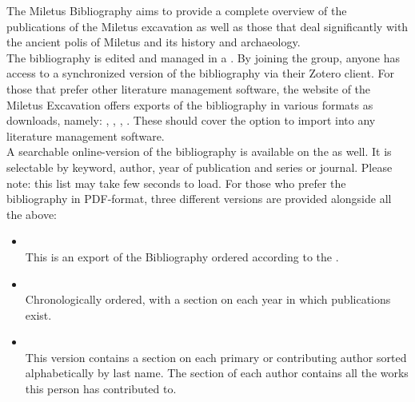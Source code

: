 \documentclass[a4paper]{scrartcl}
\newcommand{\redhref}[2]{\href{#1}{\color{uhhred}{#2}}}
\begin{document}


The Miletus Bibliography aims to provide a complete overview of the publications of the Miletus excavation as well as those that deal significantly with the ancient polis of Miletus and its history and archaeology.\\

The bibliography is edited and managed in a \redhref{https://www.zotero.org/groups/4475959/milet_bibliography}{publicly accessible Zotero group library}. By joining the group, anyone has access to a synchronized version of the bibliography via their Zotero client. For those that prefer other literature management software, the website of the Miletus Excavation offers exports of the bibliography in various formats as downloads, namely: \redhref{https://github.com/Miletus-Excavation/Miletus_Bibliography/releases/latest/download/Milet_Bibliography_BibLaTeX.bib}{BibLaTeX}, \redhref{https://github.com/Miletus-Excavation/Miletus_Bibliography/releases/latest/download/Milet_Bibliography_BibTeX.bib}{BibTeX}, \redhref{https://github.com/Miletus-Excavation/Miletus_Bibliography/releases/latest/download/Milet_Bibliography_CSV.csv}{CSV}, \redhref{https://github.com/Miletus-Excavation/Miletus_Bibliography/releases/latest/download/Milet_Bibliography_RIS.ris}{RIS}. These should cover the option to import into any literature management software.\\

A searchable online-version of the bibliography is available on the \redhref{https://www.miletgrabung.uni-hamburg.de/material/bibliographie.html}{homepage of the Miletus Excavation} as well. It is selectable by keyword, author, year of publication and series or journal. Please note: this list may take few seconds to load. For those who prefer the bibliography in PDF-format, three different versions are provided alongside all the above: 

\begin{itemize}
    \item \redhref{https://github.com/Miletus-Excavation/Miletus_Bibliography/releases/latest/download/milet-bibliographie-by-tag-pdf.pdf}{Milet-Bibliographie, by keyword (PDF)}\\
    This is an export of the Bibliography ordered according to the \redhref{https://www.miletgrabung.uni-hamburg.de/en/material/bibliographie/bib-tags.html}{System of Keywords}.
    \item \redhref{https://github.com/Miletus-Excavation/Miletus_Bibliography/releases/latest/download/milet-bibliographie-by-year-pdf.pdf}{Milet-Bibliographie, chronological (PDF)}\\
    Chronologically ordered, with a section on each year in which publications exist. 
    \item \redhref{https://github.com/Miletus-Excavation/Miletus_Bibliography/releases/latest/download/milet-bibliographie-by-author-pdf.pdf}{Milet-Bibliographie, by author (PDF)}\\
    This version contains a section on each primary or contributing author sorted alphabetically by last name. The section of each author contains all the works this person has contributed to. 
\end{itemize}
\end{document}
